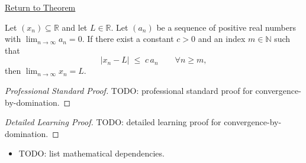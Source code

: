 \newpage
{}
\label{prf:convergence-by-domination}

\begin{remark*}[Return]
\hyperref[thm:convergence-by-domination]{Return to Theorem}
\end{remark*}

\begin{theorem*}
Let $(x_n) \subseteq \mathbb{R}$ and let $L \in \mathbb{R}$. Let
$(a_n)$ be a sequence of positive real numbers with
$\displaystyle\lim_{n \to \infty} a_n = 0$. If there exist a constant
$c > 0$ and an index $m \in \mathbb{N}$ such that
\[
    |x_n - L| \;\le\; c\, a_n \qquad \forall n \ge m,
\]
then $\displaystyle\lim_{n \to \infty} x_n = L$.

\smallskip
\noindent
\end{theorem*}

\begin{proof}[Professional Standard Proof]
\LRAProofBodyStart
TODO: professional standard proof for convergence-by-domination.
\end{proof}

\begin{proof}[Detailed Learning Proof]
\LRAProofBodyStart
TODO: detailed learning proof for convergence-by-domination.
\end{proof}

\begin{remark*}
\end{remark*}

\begin{dependencies}
\begin{itemize}
  \item TODO: list mathematical dependencies.
\end{itemize}
\end{dependencies}

\clearpage
